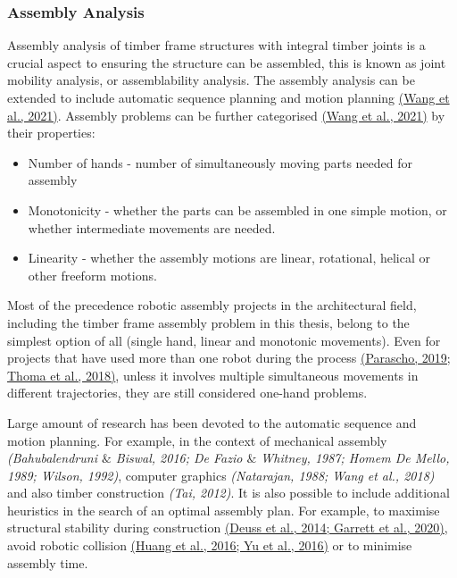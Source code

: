 \documentclass[11pt]{book}
\begin{document}
\subsubsection{Assembly Analysis}

Assembly analysis of timber frame structures with integral timber joints is a crucial aspect to ensuring the structure can be assembled, this is known as joint mobility analysis, or assemblability analysis. The assembly analysis can be extended to include automatic sequence planning and motion planning \href{https://www.zotero.org/google-docs/?JFbpMZ}{(Wang et al., 2021)}. Assembly problems can be further categorised \href{https://www.zotero.org/google-docs/?Ioe45z}{(Wang et al., 2021)} by their properties: 

\begin{itemize}
	\item Number of hands - number of simultaneously moving parts needed for assembly 

	\item Monotonicity - whether the parts can be assembled in one simple motion, or whether intermediate movements are needed.

	\item Linearity - whether the assembly motions are linear, rotational, helical or other freeform motions. 

\end{itemize}
Most of the precedence robotic assembly projects in the architectural field, including the timber frame assembly problem in this thesis, belong to the simplest option of all (single hand, linear and monotonic movements). Even for projects that have used more than one robot during the process \href{https://www.zotero.org/google-docs/?4QpBeT}{(Parascho, 2019; Thoma et al., 2018)}, unless it involves multiple simultaneous movements in different trajectories, they are still considered one-hand problems.

\begin{flushleft}
Large amount of research has been devoted to the automatic sequence and motion planning. For example, in the context of mechanical assembly\textit{ \href{https://www.zotero.org/google-docs/?AdSBUO}{}(Bahubalendruni $\&$ Biswal, 2016; De Fazio $\&$ Whitney, 1987; Homem De Mello, 1989; Wilson, 1992)}, computer graphics\textit{ \href{https://www.zotero.org/google-docs/?drprl1}{}(Natarajan, 1988; Wang et al., 2018)} and also timber construction\textit{ \href{https://www.zotero.org/google-docs/?NZFd5k}{}(Tai, 2012)}. It is also possible to include additional heuristics in the search of an optimal assembly plan. For example, to maximise structural stability during construction \href{https://www.zotero.org/google-docs/?qq9t2G}{(Deuss et al., 2014; Garrett et al., 2020)}, avoid robotic collision \href{https://www.zotero.org/google-docs/?noNjLm}{(Huang et al., 2016; Yu et al., 2016)} or to minimise assembly time.
\end{flushleft}
\end{document}
